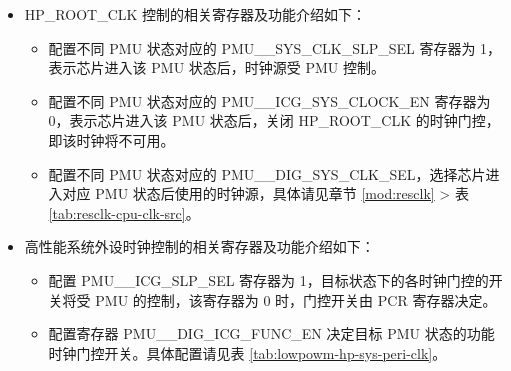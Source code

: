\documentclass[main\_\_CN.tex]{subfiles}
\begin{document}
\begin{itemize}

\item HP\_ROOT\_CLK 控制的相关寄存器及功能介绍如下：

    \begin{itemize}
    \item 配置不同 PMU 状态对应的 PMU\_\_SYS\_CLK\_SLP\_SEL 寄存器为 1，表示芯片进入该 PMU 状态后，时钟源受 PMU 控制。

    \item 配置不同 PMU 状态对应的 PMU\_\_ICG\_SYS\_CLOCK\_EN 寄存器为 0，表示芯片进入该 PMU 状态后，关闭 HP\_ROOT\_CLK 的时钟门控，即该时钟将不可用。

    \item 配置不同 PMU 状态对应的 PMU\_\_DIG\_SYS\_CLK\_SEL，选择芯片进入对应 PMU 状态后使用的时钟源，具体请见章节 \ref{mod:resclk} \textit{} > 表 \ref{tab:resclk-cpu-clk-src}。
    \end{itemize}

\item 高性能系统外设时钟控制的相关寄存器及功能介绍如下：

    \begin{itemize}
    \item 配置 PMU\_\_ICG\_SLP\_SEL 寄存器为 1，目标状态下的各时钟门控的开关将受 PMU 的控制，该寄存器为 0 时，门控开关由 PCR 寄存器决定。

    \item 配置寄存器 PMU\_\_DIG\_ICG\_FUNC\_EN 决定目标 PMU 状态的功能时钟门控开关。具体配置请见表 \ref{tab:lowpowm-hp-sys-peri-clk}。


\end{itemize}
\end{itemize}
\end{document}
